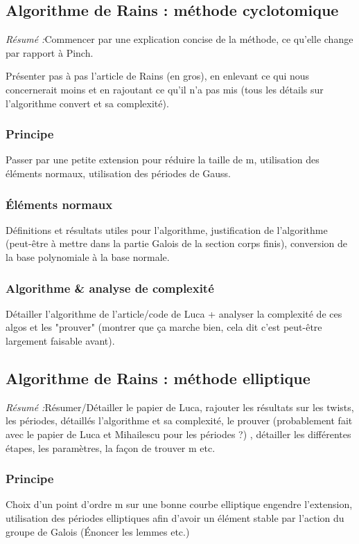 \documentclass[a4paper]{article} %
\numberwithin{equation}{section}
\begin{document}
{\subsection{Algorithme de Rains : méthode cyclotomique}
\textit{Résumé :}Commencer par une explication concise de la méthode, ce 
qu'elle change par rapport à Pinch.\par
Présenter pas à pas l'article de Rains (en gros), en enlevant ce qui nous 
concernerait moins et en rajoutant ce qu'il n'a pas mis (tous les détails 
sur l'algorithme convert et sa complexité).
\subsubsection{Principe}
Passer par une petite extension pour réduire la taille de m, utilisation des
éléments normaux, utilisation des périodes de Gauss.
\subsubsection{Éléments normaux}
Définitions et résultats utiles pour l'algorithme, justification de
l'algorithme (peut-être à mettre dans la partie Galois de la section corps
finis), conversion de la base polynomiale à la base normale.
\subsubsection{Algorithme \& analyse de complexité}
Détailler l'algorithme de l'article/code de Luca + analyser la complexité de ces
algos et les "prouver" (montrer que ça marche bien, cela dit c'est peut-être
largement faisable avant).

\subsection{Algorithme de Rains : méthode elliptique}
\textit{Résumé :}Résumer/Détailler le papier de Luca, rajouter les résultats sur
les twists, les périodes, détaillés l'algorithme et sa complexité, le prouver 
(probablement fait avec le papier de Luca et Mihailescu pour les périodes ?)
, détailler les différentes étapes, les paramètres, la façon de trouver m 
etc.
\subsubsection{Principe}
Choix d'un point d'ordre m sur une bonne courbe elliptique engendre 
l'extension, utilisation des périodes elliptiques afin d'avoir un élément 
stable par l'action du groupe de Galois (Énoncer les lemmes etc.)
}
\end{document}
